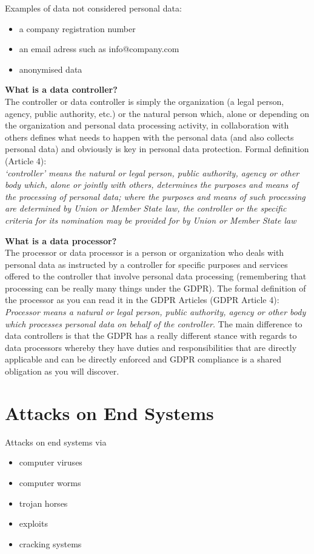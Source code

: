 \documentclass[11pt]{article}
\begin{document}
Examples of data not considered personal data:
\begin{itemize}
\item a company registration number
\item an email adress such as info@company.com
\item anonymised data
\end{itemize}

\textbf{What is a data controller?}\\
The controller or data controller is simply the organization (a legal person, agency, public authority, etc.) or the natural person which, alone or depending on the organization and personal data processing activity, in collaboration with others defines what needs to happen with the personal data (and also collects personal data) and obviously is key in personal data protection.
Formal definition (Article 4):\\
\emph{‘controller’ means the natural or legal person, public authority, agency or other body which, alone or jointly with others, determines the purposes and means of the processing of personal data; where the purposes and means of such processing are determined by Union or Member State law, the controller or the specific criteria for its nomination may be provided for by Union or Member State law}



\textbf{What is a data processor?}\\
The processor or data processor is a person or organization who deals with personal data as instructed by a controller for specific purposes and services offered to the controller that involve personal data processing (remembering that processing can be really many things under the GDPR). The formal definition of the processor as you can read it in the GDPR Articles (GDPR Article 4):\\
\emph{Processor means a natural or legal person, public authority, agency or other body which processes personal data on behalf of the controller.} The main difference to data controllers is that the GDPR has a really different stance with regards to data processors whereby they have duties and responsibilities that are directly applicable and can be directly enforced and GDPR compliance is a shared obligation as you will discover.
\section{Attacks on End Systems}
\label{sec:orgd720a9b}
Attacks on end systems via
\begin{itemize}
\item computer viruses
\item computer worms
\item trojan horses
\item exploits
\item cracking systems
\end{itemize}
\end{document}
